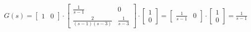 $G(s)=\left[\begin{array}{cc}1&0\end{array}\right]\cdot\left[\begin{array}{cc}\frac{1}{s-1}&0\\\frac{2}{(s-1)(s-3)}&\frac{1}{s-3}\end{array}\right]\cdot \left[\begin{array}{c}1\\0\end{array}\right]=\left[\begin{array}{cc}\frac{1}{s-1}&0\end{array}\right] \cdot \left[\begin{array}{c}1\\0\end{array}\right]=\frac{1}{s-1}$\\



\pagebreak

